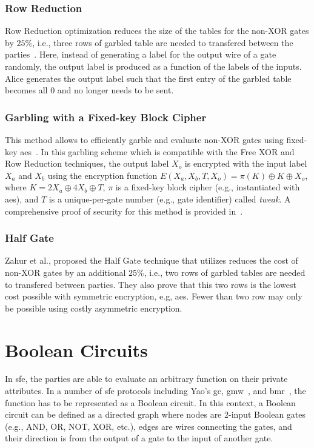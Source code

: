 \subsubsection{Row Reduction}\label{sssec:prelim-row}
Row Reduction optimization reduces the size of the tables for the non-XOR gates by $25\%$, i.e., three rows of garbled table are needed to transfered between the parties~\cite{naor1999privacy}.
Here, instead of generating a label for the output wire of a gate randomly, the output label is produced as a function of the labels of the inputs.
Alice generates the output label such that the first entry of the garbled table becomes all $0$ and no longer needs to be sent.

\subsubsection{Garbling with a Fixed-key Block Cipher}\label{sssec:prelim-aes}
This method allows to efficiently garble and evaluate non-XOR gates using fixed-key \acrshort{aes}~\cite{bellare2013efficient}.
In this garbling scheme which is compatible with the Free XOR and Row Reduction techniques, the output label $X_{o}$ is encrypted with the input label $X_{a}$ and $X_{b}$ using the encryption function $E(X_a,X_b,T,X_o) = \pi(K) \oplus K \oplus X_o$, where $K=2X_a\oplus4X_b\oplus T$, $\pi$ is a fixed-key block cipher (e.g., instantiated with \acrshort{aes}), and $T$ is a unique-per-gate number (e.g., gate identifier) called \emph{tweak}.
A comprehensive proof of security for this method is provided in~\cite{bellare2013efficient}.

\subsubsection{Half Gate}\label{sssec:prelim-half}
Zahur et al., proposed the Half Gate technique that utilizes reduces the cost of non-XOR gates by an additional $25\%$, i.e., two rows of garbled tables are needed to transfered between parties\cite{zahur2015two}.
They also prove that this two rows is the lowest cost possible with symmetric encryption, e.g, \acrshort{aes}.
Fewer than two row may only be possible using costly asymmetric encryption.

\section{Boolean Circuits}\label{sec:prelim-circuit}
In \acrshort{sfe}, the parties are able to evaluate an arbitrary function on their private attributes.
In a number of \acrshort{sfe} protocols including Yao's \acrshort{gc}, \acrfull{gmw}~\cite{goldreich1987play}, and \acrfull{bmr}~\cite{beaver1990round}, the function has to be represented as a Boolean circuit.
In this context, a Boolean circuit can be defined as a directed graph where nodes are 2-input Boolean gates (e.g., AND, OR, NOT, XOR, etc.), edges are wires connecting the gates, and their direction is from the output of a gate to the input of another gate.

